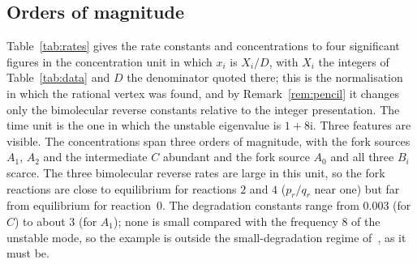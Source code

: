 \documentclass[11pt,a4paper]{article}
\theoremstyle{plain}
\theoremstyle{definition}
\theoremstyle{remark}
\numberwithin{equation}{section}
\newcommand{\iu}{\mathrm{i}}
\begin{document}
\subsection{Orders of magnitude}
Table~\ref{tab:rates} gives the rate constants and concentrations to four significant figures in the concentration unit in which $x_i$ is $X_i/D$, with $X_i$ the integers of Table~\ref{tab:data} and $D$ the denominator quoted there; this is the normalisation in which the rational vertex was found, and by Remark~\ref{rem:pencil} it changes only the bimolecular reverse constants relative to the integer presentation. The time unit is the one in which the unstable eigenvalue is $1+8\iu$. Three features are visible. The concentrations span three orders of magnitude, with the fork sources $A_1$, $A_2$ and the intermediate $C$ abundant and the fork source $A_0$ and all three $B_i$ scarce. The three bimolecular reverse rates are large in this unit, so the fork reactions are close to equilibrium for reactions $2$ and $4$ ($p_r/q_r$ near one) but far from equilibrium for reaction~$0$. The degradation constants range from $0.003$ (for $C$) to about $3$ (for $A_1$); none is small compared with the frequency $8$ of the unstable mode, so the example is outside the small-degradation regime of~\cite[Proposition~8.4]{TypeIImixed}, as it must be.
\end{document}
